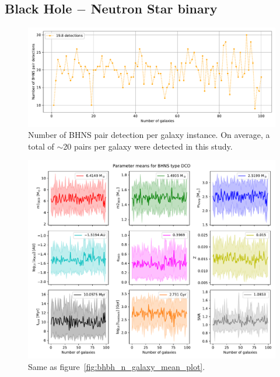 \subsection{Black Hole $-$ Neutron Star binary}
\begin{figure}[!h]
	\centering
    \includegraphics[width=\columnwidth]{analysis_data/004__images_for_latex/BHNS_n_detections}
	\caption{Number of BHNS pair detection per galaxy instance. On average, a total of $\sim$20 pairs per galaxy were detected in this study.}
	\label{fig:bhnsndetections}
\end{figure}	

\begin{figure}[!h]
	\centering
    \includegraphics[width=\columnwidth]{analysis_data/004__images_for_latex/BHNS_n_galaxy_mean_plot}
	\caption{Same as figure~\ref{fig:bhbh_n_galaxy_mean_plot}.}
	\label{fig:bhns_n_galaxy_mean_plot}
\end{figure}
